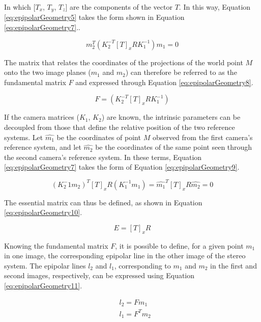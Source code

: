 In which [$T_x$, $T_y$, $T_z$] are the components of the vector $T$.  
In this way, Equation \ref{eq:epipolarGeometry5} takes the form shown in Equation \ref{eq:epipolarGeometry7}..

\begin{equation}
    \label{eq:epipolarGeometry7}
    m_2^T (K_2^{-T} [T]_x R K_1^{-1}) m_1 = 0 
\end{equation}

The matrix that relates the coordinates of the projections of the world point $M$ onto the two image planes ($m_1$ and $m_2$) can therefore be referred to as the fundamental matrix $F$ and expressed through Equation \ref{eq:epipolarGeometry8}.

\begin{equation}
\label{eq:epipolarGeometry8}
F = (K_2^{-T} [T]_x R K_1^{-1})
\end{equation}

If the camera matrices ($K_1$, $K_2$) are known, the intrinsic parameters can be decoupled from those that define the relative position of the two reference systems.  
Let $\hat{m_1}$ be the coordinates of point $M$ observed from the first camera's reference system, and let $\hat{m_2}$ be the coordinates of the same point seen through the second camera's reference system.  
In these terms, Equation \ref{eq:epipolarGeometry7} takes the form of Equation \ref{eq:epipolarGeometry9}.

\begin{equation}
  \label{eq:epipolarGeometry9}
  (K_2^-1 m_2)^T [T]_x R (K_1^{-1} m_1) = \hat{m_1}^T [T]_x R \hat{m_2} = 0
\end{equation}

The essential matrix can thus be defined, as shown in Equation \ref{eq:epipolarGeometry10}.

\begin{equation}
  \label{eq:epipolarGeometry10}
  E = [T]_x R
\end{equation}

Knowing the fundamental matrix $F$, it is possible to define, for a given point $m_1$ in one image, the corresponding epipolar line in the other image of the stereo system. The epipolar lines $l_2$ and $l_1$, corresponding to $m_1$ and $m_2$ in the first and second images, respectively, can be expressed using Equation \ref{eq:epipolarGeometry11}.

\begin{equation}
  \label{eq:epipolarGeometry11}
  \begin{aligned}
  & l_2 = F m_1  \\
  & l_1 = F^T m_2 
  \end{aligned}
\end{equation}

